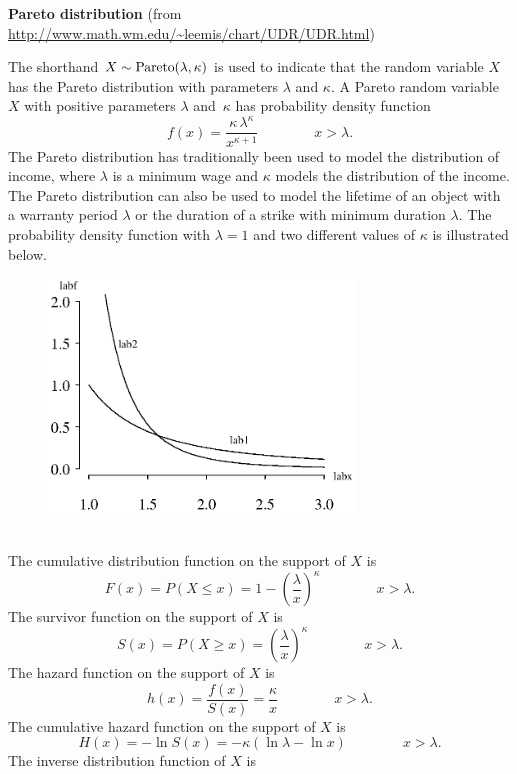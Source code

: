 \documentclass[12pt,fullpage]{article}
\begin{document}
\noindent
{\bf Pareto distribution} (from \color{blue}\url{http://www.math.wm.edu/~leemis/chart/UDR/UDR.html}\color{black})

\noindent
The shorthand $X \sim {\rm Pareto}(\lambda, \kappa)$ is used to indicate that the
random variable $X$ has the Pareto distribution with parameters $\lambda$ and $\kappa$.
A Pareto random variable $X$ with positive parameters $\lambda$ and~$\kappa$ has probability density function 
$$
f(x) = {\frac {\kappa\,{\lambda}^{\kappa}}{{x}^{\kappa+1}}} \qquad \qquad x > \lambda.
$$
The Pareto distribution has traditionally been used to model the distribution of income,
where $\lambda$ is a minimum wage and $\kappa$ models the distribution of the income.
The Pareto distribution can also be used to model the lifetime of an object with a warranty
period $\lambda$ or the duration of a strike with minimum duration $\lambda$.
The probability density function with $\lambda = 1$ and two different values of $\kappa$ is illustrated below.
{\begin{figure}[h!]
\begin{center}
\includegraphics[width=3.2in]{ParetoPlot.ps}
\end{center}
\end{figure}}\\
The cumulative distribution function on
the support of $X$ is
$$
F(x) = P(X \le x) = 1 - \left(\frac{\lambda}{x}\right)^{\kappa}  \qquad \qquad x > \lambda.
$$
The survivor function on the support of $X$ is
$$
S(x) = P(X \ge x) = \left(\frac{\lambda}{x}\right)^{\kappa}  \qquad \qquad x > \lambda.
$$
The hazard function on the support of $X$ is
$$
h(x) = \frac{f(x)}{S(x)} = \frac{\kappa}{x} \qquad \qquad x > \lambda.
$$
The cumulative hazard function on the support of $X$ is
$$
H(x) = - \ln S(x) = -\kappa (\ln \lambda - \ln x) \qquad \qquad x > \lambda.
$$
The inverse distribution function of $X$ is
\end{document}
